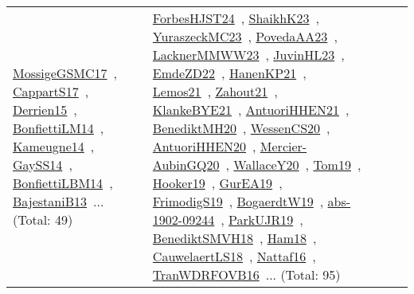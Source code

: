{\begin{longtable}{lp{3cm}>{\raggedright\arraybackslash}p{6cm}>{\raggedright\arraybackslash}p{6cm}>{\raggedright\arraybackslash}p{8cm}}
\href{works/MossigeGSMC17.pdf}{MossigeGSMC17}~\cite{MossigeGSMC17}, \href{works/CappartS17.pdf}{CappartS17}~\cite{CappartS17}, \href{works/Derrien15.pdf}{Derrien15}~\cite{Derrien15}, \href{works/BonfiettiLM14.pdf}{BonfiettiLM14}~\cite{BonfiettiLM14}, \href{works/Kameugne14.pdf}{Kameugne14}~\cite{Kameugne14}, \href{works/GaySS14.pdf}{GaySS14}~\cite{GaySS14}, \href{works/BonfiettiLBM14.pdf}{BonfiettiLBM14}~\cite{BonfiettiLBM14}, \href{works/BajestaniB13.pdf}{BajestaniB13}~\cite{BajestaniB13}... (Total: 49) & \href{works/ForbesHJST24.pdf}{ForbesHJST24}~\cite{ForbesHJST24}, \href{works/ShaikhK23.pdf}{ShaikhK23}~\cite{ShaikhK23}, \href{works/YuraszeckMC23.pdf}{YuraszeckMC23}~\cite{YuraszeckMC23}, \href{works/PovedaAA23.pdf}{PovedaAA23}~\cite{PovedaAA23}, \href{works/LacknerMMWW23.pdf}{LacknerMMWW23}~\cite{LacknerMMWW23}, \href{works/JuvinHL23.pdf}{JuvinHL23}~\cite{JuvinHL23}, \href{works/EmdeZD22.pdf}{EmdeZD22}~\cite{EmdeZD22}, \href{works/HanenKP21.pdf}{HanenKP21}~\cite{HanenKP21}, \href{works/Lemos21.pdf}{Lemos21}~\cite{Lemos21}, \href{works/Zahout21.pdf}{Zahout21}~\cite{Zahout21}, \href{works/KlankeBYE21.pdf}{KlankeBYE21}~\cite{KlankeBYE21}, \href{works/AntuoriHHEN21.pdf}{AntuoriHHEN21}~\cite{AntuoriHHEN21}, \href{works/BenediktMH20.pdf}{BenediktMH20}~\cite{BenediktMH20}, \href{works/WessenCS20.pdf}{WessenCS20}~\cite{WessenCS20}, \href{works/AntuoriHHEN20.pdf}{AntuoriHHEN20}~\cite{AntuoriHHEN20}, \href{works/Mercier-AubinGQ20.pdf}{Mercier-AubinGQ20}~\cite{Mercier-AubinGQ20}, \href{works/WallaceY20.pdf}{WallaceY20}~\cite{WallaceY20}, \href{works/Tom19.pdf}{Tom19}~\cite{Tom19}, \href{works/Hooker19.pdf}{Hooker19}~\cite{Hooker19}, \href{works/GurEA19.pdf}{GurEA19}~\cite{GurEA19}, \href{works/FrimodigS19.pdf}{FrimodigS19}~\cite{FrimodigS19}, \href{works/BogaerdtW19.pdf}{BogaerdtW19}~\cite{BogaerdtW19}, \href{works/abs-1902-09244.pdf}{abs-1902-09244}~\cite{abs-1902-09244}, \href{works/ParkUJR19.pdf}{ParkUJR19}~\cite{ParkUJR19}, \href{works/BenediktSMVH18.pdf}{BenediktSMVH18}~\cite{BenediktSMVH18}, \href{works/Ham18.pdf}{Ham18}~\cite{Ham18}, \href{works/CauwelaertLS18.pdf}{CauwelaertLS18}~\cite{CauwelaertLS18}, \href{works/Nattaf16.pdf}{Nattaf16}~\cite{Nattaf16}, \href{works/TranWDRFOVB16.pdf}{TranWDRFOVB16}~\cite{TranWDRFOVB16}... (Total: 95)\\

\end{longtable}}
